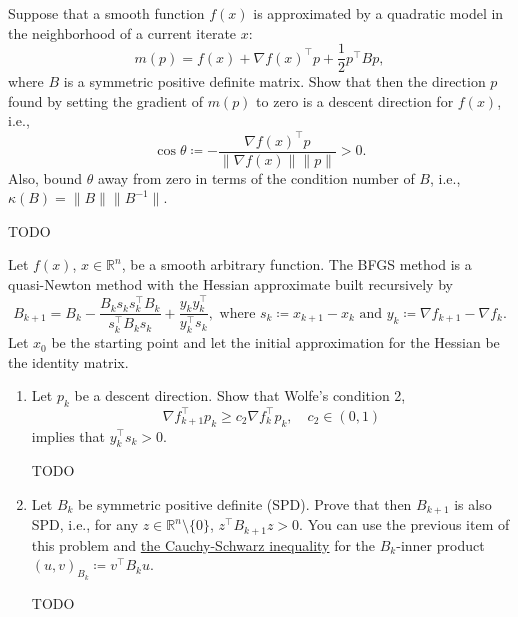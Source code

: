 \documentclass{../../../kin_math}
\begin{document}
\begin{questions}
  \question Suppose that a smooth function $f(x)$ is approximated by a quadratic model in the neighborhood of a current iterate $x$:
  \begin{equation*}
    m(p) = f(x) + \nabla f(x)^\top p + \frac{1}{2} p^\top B p,
  \end{equation*}
  where $B$ is a symmetric positive definite matrix. Show that then the direction $p$ found by setting the gradient of $m(p)$ to zero is a descent direction for $f(x)$, i.e.,
  \begin{equation*}
    \cos \theta \coloneqq - \frac{\nabla f(x)^\top p}{\lVert \nabla f(x) \rVert \lVert p \rVert} > 0.
  \end{equation*}
  Also, bound $\theta$ away from zero in terms of the condition number of $B$, i.e., $\kappa(B) = \lVert B \rVert \lVert B^{-1} \rVert$.
  \begin{solution}
    TODO
  \end{solution}

  \question Let $f(x)$, $x \in \mathbb{R}^n$, be a smooth arbitrary function. The BFGS method is a quasi-Newton method with the Hessian approximate built recursively by
  \begin{equation*}
    B_{k + 1} = B_k - \frac{B_k s_k s_k^\top B_k}{s_k^\top B_k s_k} + \frac{y_k y_k^\top}{y_k^\top s_k}, \text{ where } s_k \coloneqq x_{k + 1} - x_k \text{ and } y_k \coloneqq \nabla f_{k + 1} - \nabla f_k.
  \end{equation*}
  Let $x_0$ be the starting point and let the initial approximation for the Hessian be the identity matrix.
  \begin{enumerate}
    \item Let $p_k$ be a descent direction. Show that Wolfe's condition 2,
    \begin{equation*}
      \nabla f_{k + 1}^\top p_k \geq c_2 \nabla f_k^\top p_k, \quad c_2 \in (0, 1)
    \end{equation*}
    implies that $y_k^\top s_k > 0$.
    \begin{solution}
      TODO
    \end{solution}
    \item Let $B_k$ be symmetric positive definite (SPD). Prove that then $B_{k + 1}$ is also SPD, i.e., for any $z \in \mathbb{R}^n \setminus \{0\}$, $z^\top B_{k + 1} z > 0$. You can use the previous item of this problem and \href{https://en.wikipedia.org/wiki/Cauchy%E2%80%93Schwarz_inequality}{the Cauchy-Schwarz inequality} for the $B_k$-inner product $(u, v)_{B_k} \coloneqq v^\top B_k u$.
    \begin{solution}
      TODO
    \end{solution}
  \end{enumerate}


\end{questions}
\end{document}
